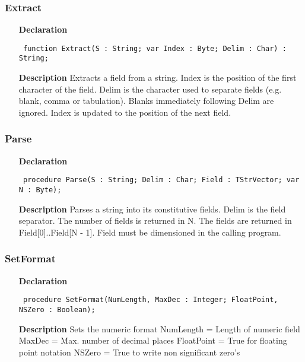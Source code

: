 \documentclass[12pt,a4paper,oneside]{report}
\newcommand{\declarationitem}[1]{\textbf{#1}}
\newcommand{\descriptiontitle}[1]{\textbf{#1}}
\newcommand{\code}[1]{\texttt{#1}}
\begin{document}
\subsubsection{Extract}
\label{ustrings-Extract}
\begin{itemize}\item[\declarationitem{Declaration}\hfill]
	\begin{flushleft}
		\code{
			function Extract(S : String; var Index : Byte; Delim : Char) : String;}
		
	\end{flushleft}
	
	\par
	\item[\descriptiontitle{Description}]
	Extracts a field from a string. Index is the position of the first character of the field. Delim is the character used to separate fields (e.g. blank, comma or tabulation). Blanks immediately following Delim are ignored. Index is updated to the position of the next field.
	
\end{itemize}
\subsubsection{Parse}
\label{ustrings-Parse}
\begin{itemize}\item[\declarationitem{Declaration}\hfill]
	\begin{flushleft}
		\code{
			procedure Parse(S : String; Delim : Char; Field : TStrVector; var N : Byte);}
		
	\end{flushleft}
	
	\par
	\item[\descriptiontitle{Description}]
	Parses a string into its constitutive fields. Delim is the field separator. The number of fields is returned in N. The fields are returned in Field[0]..Field[N {-} 1]. Field must be dimensioned in the calling program.
	
\end{itemize}
\subsubsection{SetFormat}
\label{ustrings-SetFormat}
\begin{itemize}\item[\declarationitem{Declaration}\hfill]
	\begin{flushleft}
		\code{
			procedure SetFormat(NumLength, MaxDec : Integer; FloatPoint, NSZero : Boolean);}
		
	\end{flushleft}
	
	\par
	\item[\descriptiontitle{Description}]
	Sets the numeric format NumLength = Length of numeric field MaxDec = Max. number of decimal places FloatPoint = True for floating point notation NSZero = True to write non significant zero's
	
\end{itemize}
\end{document}
